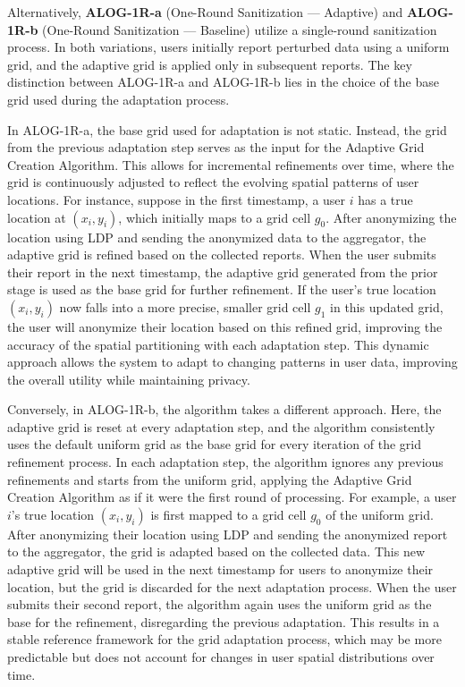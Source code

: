 Alternatively, \textbf{ALOG-1R-a} (One-Round Sanitization — Adaptive) and \textbf{ALOG-1R-b} (One-Round Sanitization — Baseline) utilize a single-round sanitization process. In both variations, users initially report perturbed data using a uniform grid, and the adaptive grid is applied only in subsequent reports. The key distinction between ALOG-1R-a and ALOG-1R-b lies in the choice of the base grid used during the adaptation process.


In ALOG-1R-a, the base grid used for adaptation is not static. Instead, the grid from the previous adaptation step serves as the input for the Adaptive Grid Creation Algorithm. This allows for incremental refinements over time, where the grid is continuously adjusted to reflect the evolving spatial patterns of user locations. For instance, suppose in the first timestamp, a user $i$ has a true location at $(x_i, y_i)$, which initially maps to a grid cell $g_0$. After anonymizing the location using LDP and sending the anonymized data to the aggregator, the adaptive grid is refined based on the collected reports. When the user submits their report in the next timestamp, the adaptive grid generated from the prior stage is used as the base grid for further refinement. If the user's true location $(x_i, y_i)$ now falls into a more precise, smaller grid cell $g_1$ in this updated grid, the user will anonymize their location based on this refined grid, improving the accuracy of the spatial partitioning with each adaptation step. This dynamic approach allows the system to adapt to changing patterns in user data, improving the overall utility while maintaining privacy.

Conversely, in ALOG-1R-b, the algorithm takes a different approach. Here, the adaptive grid is reset at every adaptation step, and the algorithm consistently uses the default uniform grid as the base grid for every iteration of the grid refinement process. In each adaptation step, the algorithm ignores any previous refinements and starts from the uniform grid, applying the Adaptive Grid Creation Algorithm as if it were the first round of processing. For example, a user $i$'s true location $(x_i, y_i)$ is first mapped to a grid cell $g_0$ of the uniform grid. After anonymizing their location using LDP and sending the anonymized report to the aggregator, the grid is adapted based on the collected data. This new adaptive grid will be used in the next timestamp for users to anonymize their location, but the grid is discarded for the next adaptation process. When the user submits their second report, the algorithm again uses the uniform grid as the base for the refinement, disregarding the previous adaptation. This results in a stable reference framework for the grid adaptation process, which may be more predictable but does not account for changes in user spatial distributions over time.


